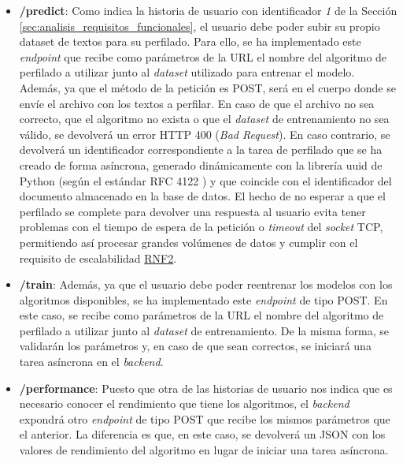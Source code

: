\begin{itemize}
	\item \textbf{/predict}: Como indica la historia de usuario con identificador \textit{1} de la Sección \ref{sec:analisis_requisitos_funcionales}, el usuario
	      debe poder subir su propio dataset de textos para su perfilado. Para ello, se ha implementado este \textit{endpoint} que recibe como parámetros de la URL el
	      nombre del algoritmo de perfilado a utilizar junto al \textit{dataset} utilizado para entrenar el modelo. Además, ya que el método de la petición es POST,
	      será en el cuerpo donde se envíe
	      el archivo con los textos a perfilar. En caso de que el archivo no sea correcto, que el algoritmo no exista o que el \textit{dataset} de entrenamiento
	      no sea válido, se devolverá un error HTTP 400 (\textit{Bad Request}). En caso contrario, se devolverá un identificador correspondiente a la tarea de perfilado
	      que se ha creado de forma asíncrona, generado dinámicamente con la librería uuid \cite{uuidpython} de Python (según el estándar RFC 4122 \cite{rfc4122}) y que coincide
	      con el identificador del documento almacenado en la base de datos.
	      El hecho de no esperar a que el perfilado se complete
	      para devolver una respuesta al usuario evita tener problemas con el tiempo de espera de la petición o \textit{timeout} del \textit{socket} TCP,
	      permitiendo así procesar grandes volúmenes de datos y cumplir con el requisito de escalabilidad \hyperref[req:rnf2]{RNF2}.

	\item \textbf{/train}: Además, ya que el usuario debe poder reentrenar los modelos con los algoritmos disponibles, se ha implementado este \textit{endpoint} de tipo POST.
	      En este caso, se recibe como parámetros de la URL el nombre del algoritmo de perfilado a utilizar junto al \textit{dataset} de entrenamiento. De la misma forma,
	      se validarán los parámetros y, en caso de que sean correctos, se iniciará una tarea asíncrona en el \textit{backend}.

	\item \textbf{/performance}: Puesto que otra de las historias de usuario nos indica que es necesario conocer el rendimiento que tiene los algoritmos,
	      el \textit{backend} expondrá otro \textit{endpoint} de tipo POST que recibe los mismos parámetros que el anterior. La diferencia es que, en este caso,
	      se devolverá un JSON con los valores de rendimiento del algoritmo en lugar de iniciar una tarea asíncrona.


\end{itemize}
